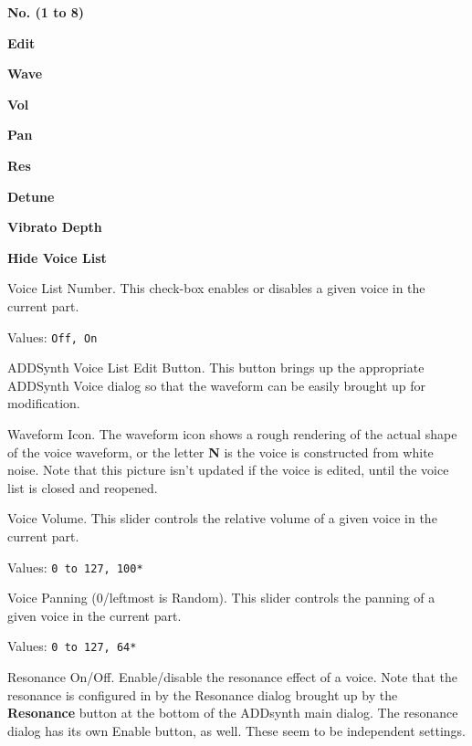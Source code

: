    \begin{enumber}
      \item \textbf{No. (1 to 8)}
      \item \textbf{Edit}
      \item \textbf{Wave}
      \item \textbf{Vol}
      \item \textbf{Pan}
      \item \textbf{Res}
      \item \textbf{Detune}
      \item \textbf{Vibrato Depth}
      \item \textbf{Hide Voice List}
   \end{enumber}

   \setcounter{ItemCounter}{0}      %

   Voice List Number.
   This check-box enables or disables a given voice in the current part.

   Values: \texttt{Off, On}

   ADDSynth Voice List Edit Button.
   This button brings up the appropriate ADDSynth Voice dialog so that the
   waveform can be easily brought up for modification.

   Waveform Icon.
   The waveform icon shows a rough rendering of the actual shape of the
   voice waveform, or the letter \textbf{N} is the voice is constructed from
   white noise.  Note that this picture isn't updated if the voice is
   edited, until the voice list is closed and reopened.

   Voice Volume.
   This slider controls the relative volume of a given voice in the current
   part.

   Values: \texttt{0 to 127, 100*}

   Voice Panning (0/leftmost is Random).
   This slider controls the panning of a given voice in the current part.

   Values: \texttt{0 to 127, 64*}

   Resonance On/Off.
   Enable/disable the resonance effect of a voice.
   Note that the resonance is configured in by the Resonance dialog brought
   up by the \textbf{Resonance} button at the bottom of the ADDsynth main
   dialog.  The resonance dialog has its own Enable button, as well.
   These seem to be independent settings.

